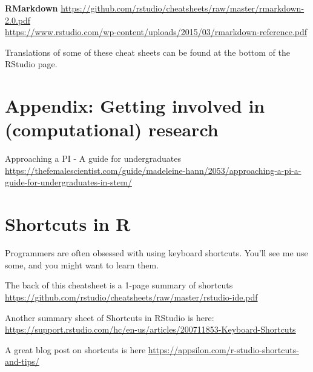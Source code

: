 \documentclass[
]{book}
\begin{document}
\textbf{RMarkdown}
\url{https://github.com/rstudio/cheatsheets/raw/master/rmarkdown-2.0.pdf}\\
\url{https://www.rstudio.com/wp-content/uploads/2015/03/rmarkdown-reference.pdf}

Translations of some of these cheat sheets can be found at the bottom of the RStudio page.

\hypertarget{appendix-getting-involved-in-computational-research}{%
\chapter{Appendix: Getting involved in (computational) research}\label{appendix-getting-involved-in-computational-research}}

Approaching a PI - A guide for undergraduates \url{https://thefemalescientist.com/guide/madeleine-hann/2053/approaching-a-pi-a-guide-for-undergraduates-in-stem/}

\hypertarget{shortcuts-in-r}{%
\chapter{Shortcuts in R}\label{shortcuts-in-r}}

Programmers are often obsessed with using keyboard shortcuts. You'll see me use some, and you might want to learn them.

The back of this cheatsheet is a 1-page summary of shortcuts
\url{https://github.com/rstudio/cheatsheets/raw/master/rstudio-ide.pdf}

Another summary sheet of Shortcuts in RStudio is here:
\url{https://support.rstudio.com/hc/en-us/articles/200711853-Keyboard-Shortcuts}

A great blog post on shortcuts is here
\url{https://appsilon.com/r-studio-shortcuts-and-tips/}
\end{document}
